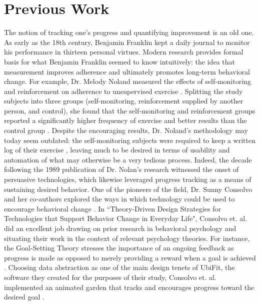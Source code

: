 \documentclass{sigchi}
\begin{document}
\section{Previous Work}
The notion of tracking one's progress and quantifying improvement is an old one. As early as the 18th century, Benjamin Franklin kept a daily journal to monitor his performance in thirteen personal virtues. 
Modern research provides formal basis for what Benjamin Franklin seemed to know intuitively: the idea that measurement improves adherence and ultimately promotes long-term behavioral change. For example, Dr. Melody Noland measured the effects of self-monitoring and reinforcement on adherence to unsupervised exercise
\cite{Noland1989Effects}. 
Splitting the study subjects into three groups (self-monitoring, reinforcement supplied by another person, and control), she found that the self-monitoring and reinforcement groups reported a significantly higher frequency of exercise and better results than the control group 
\cite{Noland1989Effects}. %
Despite the encouraging results, Dr. Noland's methodology may today seem outdated: the self-monitoring subjects were required to keep a written log of their exercise
\cite{Noland1989Effects}, %
leaving much to be desired in terms of usability and automation of what may otherwise be a very tedious process. Indeed, the decade following the 1989 publication of Dr. Nolan’s research witnessed the onset of persuasive technologies, which likewise leveraged progress tracking as a means of sustaining desired behavior. 
One of the pioneers of the field, Dr. Sunny Consolvo and her co-authors explored the ways in which technology could be used to encourage behavioral change
\cite{Consolvo2009Theory, Consolvo2008Flowers}. %
In ``Theory-Driven Design Strategies for Technologies that Support Behavior Change in Everyday Life", Consolvo et. al. did an excellent job drawing on prior research in behavioral psychology and situating their work in the context of relevant psychology theories. For instance, the Goal-Setting Theory stresses the importance of an ongoing feedback as progress is made as opposed to merely providing a reward when a goal is achieved 
\cite{Consolvo2009Theory}. %
Choosing data abstraction as one of the main design tenets of UbiFit, the software they created for the purposes of their study, Consolvo et. al. implemented an animated garden that tracks and encourages progress toward the desired goal 
\cite{Consolvo2009Theory, Consolvo2008Flowers}. %
\end{document}
